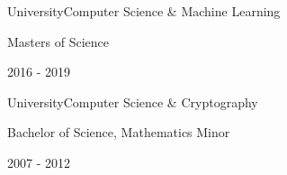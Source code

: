 \documentclass{article}
\newenvironment{*mylist}[2]{
  \subsection*{#1}
  \small
  \begin{list}{}{}
   \setlength{\topsep}{0pt}
   \setlength{\itemsep}{1pt}
   \setlength{\parskip}{0pt}
   \setlength{\parsep}{0pt}
 \item {\bf #2}
}{\end{list}\normalsize}
\newcommand{\LUx}[1]{{\bf\em #1}}
\begin{document}
\begin{comment}
\item \href{https://github.com/probinso/adarailz}{AdaRailz Concurrent Model Train Control System}\hfill\LUx{Ada}
\item TwixT AI Agent and UI\hfill\LUx{Java}
\item Image Manipulation Program \hfill\LUx{C\#}
\item Unix Shell \hfill\LUx{C}
\end{**mylist}
\normalsize
\end{comment}

\BSec{}%

\begin{multicols}{2}

  \begin{*mylist}{ University}{Computer Science \& Machine Learning}
    \item Masters of Science
    \item 2016 - 2019%
\end{*mylist}\columnbreak

  \raggedright
  \begin{*mylist}{ University}{Computer Science \& Cryptography}
  \item Bachelor of Science, Mathematics Minor
  \item 2007 - 2012
  \end{*mylist}
\end{multicols}
\end{document}
